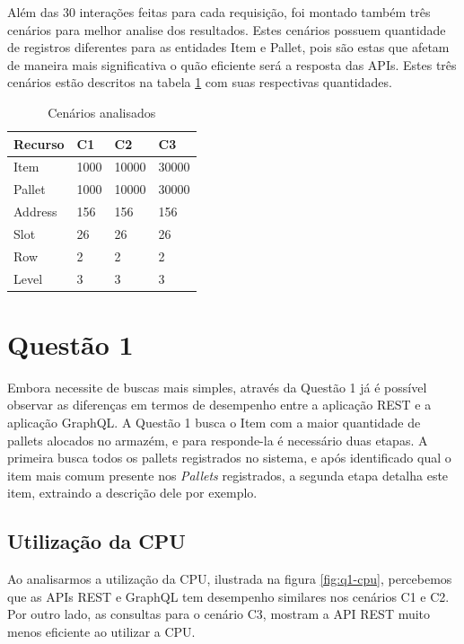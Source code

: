 Além das 30 interações feitas para cada requisição, foi montado também três cenários para melhor analise dos resultados. Estes cenários possuem quantidade de registros diferentes para as entidades Item e Pallet, pois são estas que afetam de maneira mais significativa o quão eficiente será a resposta das APIs. Estes três cenários estão descritos na tabela \ref{tab:cenarios} com suas respectivas quantidades.

\begin{table}[htbp]
    \centering
    \begin{tabular}{| l | l | l | l|}
        \hline
        \textbf{Recurso} & \textbf{C1} & \textbf{C2} & \textbf{C3} \\ \hline
        Item & 1000 & 10000 & 30000 \\ \hline
        Pallet & 1000 & 10000 & 30000 \\ \hline
        Address & 156 & 156 & 156 \\ \hline
        Slot & 26 & 26 & 26 \\ \hline
        Row & 2 & 2 & 2 \\ \hline
        Level & 3 & 3 & 3 \\ \hline
    \end{tabular}
    \caption{Cenários analisados} 
    \label{tab:cenarios}
\end{table}

\section{Questão 1}

Embora necessite de buscas mais simples, através da Questão 1 já é possível observar as diferenças em termos de desempenho entre a aplicação REST e a aplicação GraphQL. A Questão 1 busca o Item com a maior quantidade de pallets alocados no armazém, e para responde-la é necessário duas etapas. A primeira busca todos os pallets registrados no sistema, e após identificado qual o item mais comum presente nos \textit{Pallets} registrados, a segunda etapa detalha este item, extraindo a descrição dele por exemplo.

\subsection{Utilização da CPU}

Ao analisarmos a utilização da CPU, ilustrada na figura \ref{fig:q1-cpu}, percebemos que as APIs REST e GraphQL tem desempenho similares nos cenários C1 e C2. Por outro lado, as consultas para o cenário C3, mostram a API REST muito menos eficiente ao utilizar a CPU.

